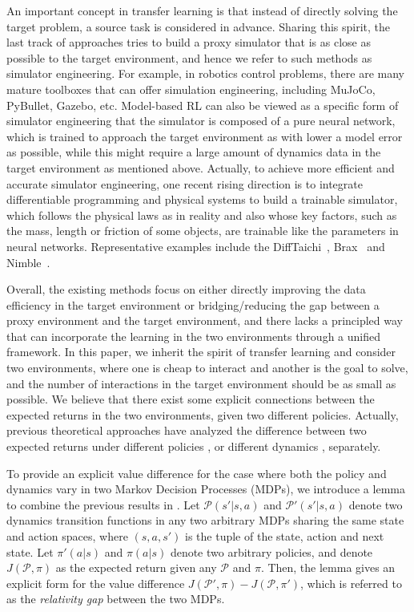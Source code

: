 \documentclass[letterpaper]{article} %
\def\P{{\mathcal{P}}}
\begin{document}
An important concept in transfer learning is that instead of directly solving the target problem, a source task is considered in advance. Sharing this spirit, the last track of approaches tries to build a proxy simulator that is as close as possible to the target environment, and hence we refer to such methods as simulator engineering. For example, in robotics control problems, there are many mature toolboxes that can offer simulation engineering, including MuJoCo, PyBullet, Gazebo, etc. Model-based RL can also be viewed as a specific form of simulator engineering that the simulator is composed of a pure neural network, which is trained to approach the target environment as with lower a model error as possible, while this might require a large amount of dynamics data in the target environment as mentioned above. Actually, to achieve more efficient and accurate simulator engineering, one recent rising direction is to integrate differentiable programming and physical systems to build a trainable simulator, which follows the physical laws as in reality and also whose key factors, such as the mass, length or friction of some objects, are trainable like the parameters in neural networks. Representative examples include the DiffTaichi~\citep{hu2020difftaichi}, Brax~\citep{brax2021github} and Nimble~\citep{werling2021fast}.

Overall, the existing methods focus on either directly improving the data efficiency in the target environment or bridging/reducing the gap between a proxy environment and the target environment, and there lacks a principled way that can incorporate the learning in the two environments through a unified framework. 
In this paper, we inherit the spirit of transfer learning and consider two environments, where one is cheap to interact and another is the goal to solve, and the number of interactions in the target environment should be as small as possible. 
We believe that there exist some explicit connections between the expected returns in the two environments, given two different policies. 
Actually, previous theoretical approaches have analyzed the difference between two expected returns under different policies \citep{kakade2002,schulman2015trust}, or different dynamics \citep{luo2018algorithmic}, separately.

To provide an explicit value difference for the case where both the policy and dynamics vary in two Markov Decision Processes (MDPs), we introduce a lemma to combine the previous results in \citep{kakade2002,luo2018algorithmic}.
Let $\P(s'|s,a)$ and $\P'(s'|s,a)$ denote two dynamics transition functions in any two arbitrary MDPs sharing the same state and action spaces, where $(s,a,s')$ is the tuple of the state, action and next state. Let $\pi'(a|s)$ and $\pi(a|s)$ denote two arbitrary policies, and denote $J(\P, \pi)$ as the expected return given any $\P$ and $\pi$. 
Then, the lemma gives an explicit form for the value difference $J(\P',\pi)-J(\P,\pi')$, which is referred to as the \emph{relativity gap} between the two MDPs. 
\end{document}
